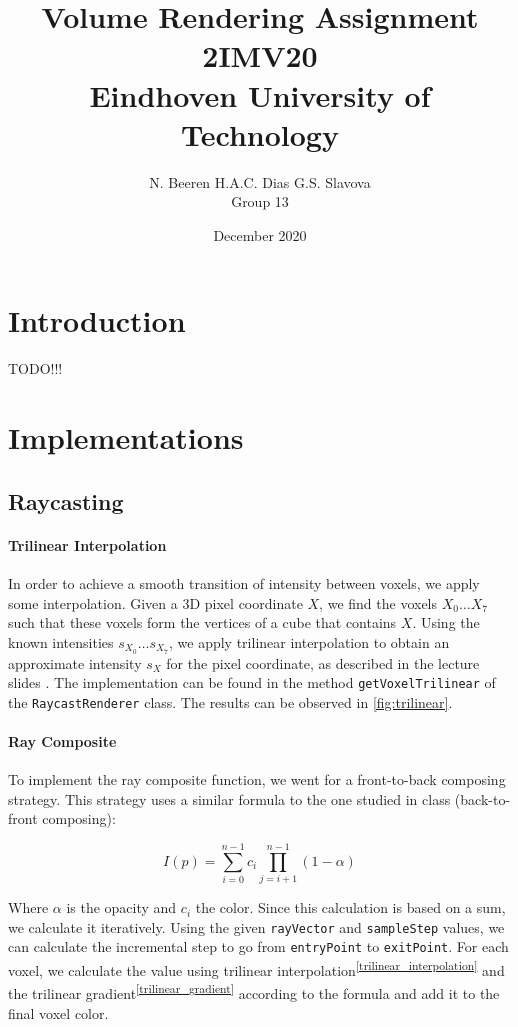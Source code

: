 \documentclass[a4paper]{article}
\title{Volume Rendering Assignment\\2IMV20\\Eindhoven University of Technology}
\author{N. Beeren \quad H.A.C. Dias \quad G.S. Slavova\\Group 13}
\date{December 2020}
\begin{document}
\maketitle

\section{Introduction}

TODO!!!

\section{Implementations}

\subsection{Raycasting}

\paragraph{Trilinear Interpolation}
\label{trilinear_interpolation}

In order to achieve a smooth transition of intensity between voxels, we apply some interpolation. Given a 3D pixel coordinate $X$, we find the voxels $X_0 \ldots X_7$ such that these voxels form the vertices of a cube that contains $X$. Using the known intensities $s_{X_0}\ldots s_{X_7}$, we apply trilinear interpolation to obtain an approximate intensity $s_X$ for the pixel coordinate, as described in the lecture slides \citep{2imv20_2}. The implementation can be found in the method {\tt getVoxelTrilinear} of the {\tt RaycastRenderer} class. The results can be observed in \autoref{fig:trilinear}.

\paragraph{Ray Composite}
\label{ray_composite}

To implement the ray composite function, we went for a front-to-back composing strategy. This strategy uses a similar formula to the one studied in class (back-to-front composing):

$$I(p)=\sum^{n-1}_{i=0}c_i\prod^{n-1}_{j=i+1}(1-\alpha)$$

Where $\alpha$ is the opacity and $c_i$ the color. Since this calculation is based on a sum, we calculate it iteratively. Using the given {\tt rayVector} and {\tt sampleStep} values, we can calculate the incremental step to go from {\tt entryPoint} to {\tt exitPoint}. For each voxel, we calculate the value using trilinear interpolation\textsuperscript{\autoref{trilinear_interpolation}} and the trilinear gradient\textsuperscript{\autoref{trilinear_gradient}} according to the formula and add it to the final voxel color.
\end{document}

